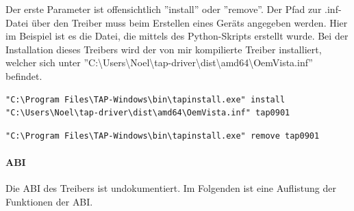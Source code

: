 Der erste Parameter ist offensichtlich ''install'' oder ''remove''. Der Pfad zur .inf-Datei
über den Treiber muss beim Erstellen eines Geräts angegeben werden. Hier im Beispiel
ist es die Datei, die mittels des Python-Skripts erstellt wurde. Bei der Installation
dieses Treibers wird der von mir kompilierte Treiber installiert, welcher sich unter 
''C:\textbackslash{}Users\textbackslash{}Noel\textbackslash{}tap-driver\textbackslash{}dist\textbackslash{}amd64\textbackslash{}OemVista.inf''
befindet.

\begin{lstlisting}[caption=Erstellung eines TAP-Geraets]
"C:\Program Files\TAP-Windows\bin\tapinstall.exe" install "C:\Users\Noel\tap-driver\dist\amd64\OemVista.inf" tap0901
\end{lstlisting}

\begin{lstlisting}[caption=Löschung aller TAP-Geraete]
"C:\Program Files\TAP-Windows\bin\tapinstall.exe" remove tap0901
\end{lstlisting}

\paragraph{ABI}
Die \ac{ABI} des Treibers ist undokumentiert. Im Folgenden ist eine Auflistung
der Funktionen der \ac{ABI}.

